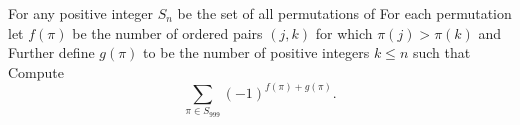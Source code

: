 For any positive integer  $S_{n}$ be the set of all permutations of  For each permutation  let $f(\pi)$ be the number of ordered pairs $(j,k)$ for which $\pi(j)>\pi(k)$ and  Further define $g(\pi)$ to be the number of positive integers $k \leq n$ such that  Compute \[ \sum_{\pi \in S_{999}} (-1)^{f(\pi)+g(\pi)}. \]